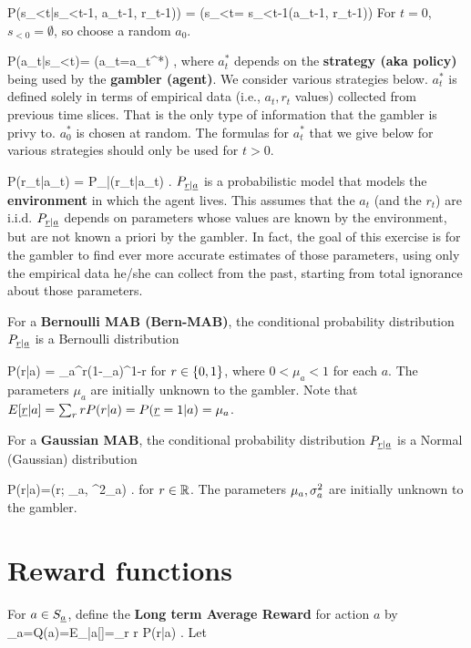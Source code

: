 \beq\color{blue}
P(s_{<t}|s_{<t-1}, a_{t-1}, r_{t-1})) = 
\indi(s_{<t}= s_{<t-1}\cup (a_{t-1}, r_{t-1}))
\eeq
For $t=0$, $s_{<0}=\emptyset$, so
 choose a random $a_0$.

\beq\color{blue}
P(a_t|s_{<t})= \indi(a_t=a_t^*)
\;\;
\;,
\eeq
where $a^*_t$ depends on the
 {\bf strategy (aka policy)} being used
by the {\bf gambler (agent)}.
We consider various
strategies below.
$a^*_t$ is defined
solely in terms
of empirical data
(i.e., $a_t, r_t$
values)
collected from previous 
time slices.
That is the only  type of
information that
the gambler 
is privy to.
$a_0^*$ is chosen at random.
The formulas for $a_t^*$
that we give below 
for various strategies
should only be used for $t>0$.

\beq\color{blue}
P(r_t|a_t) =
P_{\rvr|\rva}(r_t|a_t)
\;\;
\;.
\eeq
$P_{{\underline{r}}|{\underline{a}}}$
is 
a probabilistic model that
models the {\bf environment}
in which the agent lives.
This 
assumes that the $a_t$ (and the $r_t$)
are i.i.d.
$P_{{\underline{r}}|{\underline{a}}}$ 
depends on parameters
whose values are known
by the environment, 
but 
are not known
a priori
by the gambler.
In fact, the goal
of this exercise is for
the gambler to
 find 
ever more accurate 
estimates of those parameters,
using only the empirical 
data he/she can collect
from the past,
starting from total
ignorance about those parameters.


For a {\bf Bernoulli MAB (Bern-MAB)}, the 
conditional probability 
distribution $P_{{\underline{r}}|{\underline{a}}}$
is
a Bernoulli distribution 

\beq
P(r|a) = \mu_a^r(1-\mu_a)^{1-r}
\eeq
for $r\in \{0,1\}$, where $0<\mu_a<1$ for each $a$.
The parameters $\mu_a$ are initially 
unknown to the gambler.
Note that $E[{\underline{r}}|a]=
\sum_r r P(r|a)=P({\underline{r}}=1|a)=\mu_a$.

For a {\bf Gaussian MAB}, the 
conditional probability 
distribution $P_{{\underline{r}}|{\underline{a}}}$
is
a Normal (Gaussian) distribution

\beq
P(r|a)=\caln(r; \mu_a, \s^2_a)
\;.
\eeq
for $r\in{ \mathbb{R}}$.
The parameters $\mu_a, \sigma^2_a$ are initially 
unknown to the gambler.
 
\section{Reward functions}




For $a\in S_{\underline{a}}$, define the 
{\bf Long term Average Reward} for action $a$ by
\beq
\mu_a=Q(a)=E_{|a}[\rvr]=\sum_r r P(r|a)
\;.
\eeq
Let

